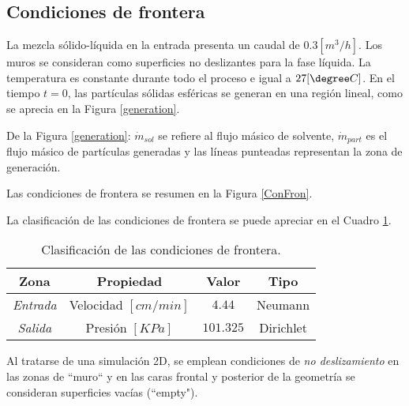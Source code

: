 \subsection{Condiciones de frontera} \label{CondF}

\noindent
\justify

La mezcla s\'olido-l\'iquida en la entrada presenta un caudal de $0.3 \left[m^3 /h \right]$. Los muros se consideran como superficies no deslizantes para la fase l\'iquida. La temperatura es constante durante todo el proceso e igual a $27 [\degree C]$. En el tiempo $t=0$, las part\'iculas s\'olidas esf\'ericas se generan en una regi\'on lineal, como se aprecia en la Figura \ref{generation}.



\noindent
\justify

De la Figura \ref{generation}: $\dot{m} _{sol}$ se refiere al flujo m\'asico de solvente, $\dot{m} _{part}$ es el flujo m\'asico de part\'iculas generadas y las l\'ineas punteadas representan la zona de generaci\'on.

\noindent
\justify

Las condiciones de frontera se resumen en la Figura \ref{ConFron}.



\noindent
\justify

La clasificaci\'on de las condiciones de frontera se puede apreciar en el Cuadro \ref{CFT}.

\begin{table}[h!]
	\centering
	\begin{tabular}{|c|c|c|c|}
		\hline
		\textbf{Zona} & \textbf{Propiedad} & \textbf{Valor} & \textbf{Tipo} \\ \hline
		\textit{Entrada} & Velocidad $[cm/min]$ & $4.44$ & Neumann \\ \hline
		\textit{Salida} & Presi\'on $[KPa]$ & $101.325$ & Dirichlet \\ \hline
	\end{tabular}
	\caption{Clasificaci\'on de las condiciones de frontera.}
	\label{CFT}
\end{table}

\noindent
\justify

Al tratarse de una simulaci\'on 2D, se emplean condiciones de \textit{no deslizamiento} en las zonas de ``muro`` y en las caras frontal y posterior de la geometr\'ia se consideran superficies vac\'ias (``empty").